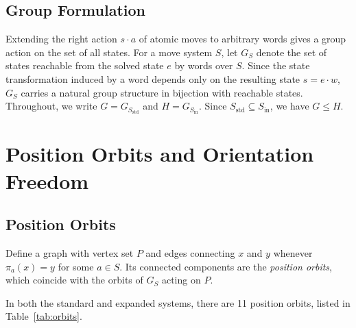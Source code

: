 \documentclass[a4paper,11pt]{article}
\begin{document}
\subsection{Group Formulation}

Extending the right action $s\cdot a$ of atomic moves to arbitrary words gives a group action on the set of all states.
For a move system $S$, let $G_S$ denote the set of states reachable from the solved state $e$ by words over $S$.
Since the state transformation induced by a word depends only on the resulting state $s=e\cdot w$, $G_S$ carries a natural group structure in bijection with reachable states.
Throughout, we write $G=G_{S_{\mathrm{std}}}$ and $H=G_{S_{\mathrm{in}}}$. Since $S_{\mathrm{std}}\subseteq S_{\mathrm{in}}$, we have $G\le H$.

\section{Position Orbits and Orientation Freedom}\label{sec:orbits}

\subsection{Position Orbits}

Define a graph with vertex set $P$ and edges connecting $x$ and $y$ whenever $\pi_a(x)=y$ for some $a\in S$. Its connected components are the \emph{position orbits}, which coincide with the orbits of $G_S$ acting on $P$.

\begin{proposition}[Check C2]\label{prop:orbits}
In both the standard and expanded systems, there are 11 position orbits, listed in Table~\ref{tab:orbits}.
\end{proposition}
\end{document}

